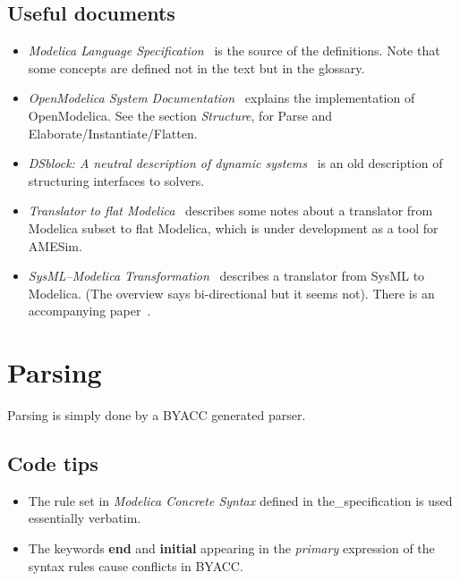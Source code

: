 \documentclass[10pt,b5paper]{article}
\begin{document}

\subsection{Useful documents}

\begin{itemize}

\item {\it{}Modelica Language Specification}~\cite{specification34} is
the source of the definitions.  Note that some concepts are defined
not in the text but in the glossary.

\item {\it{}OpenModelica System Documentation}~\cite{openmodelica2014}
explains the implementation of OpenModelica.  See the section
{\it{}Structure}, for Parse and Elaborate/Instantiate/Flatten.

\item {\it{}DSblock: A neutral description of dynamic
systems}~\cite{otter1994} is an old description of structuring
interfaces to solvers.

\item {\it{}Translator to flat Modelica}~\cite{lms2007} describes some
notes about a translator from Modelica subset to flat Modelica, which
is under development as a tool for AMESim.

\item {\it{}SysML--Modelica Transformation}~\cite{omg2012} describes a
translator from SysML to Modelica.  (The overview says bi-directional
but it seems not).  There is an accompanying paper~\cite{paredis2010}.

\end{itemize}


\section{Parsing}

{Parsing} is simply done by a BYACC generated parser.


\subsection{Code tips}

\begin{itemize}

\item The rule set in {\it{}Modelica Concrete Syntax\/} defined in
the_specification is used essentially verbatim.

\item The keywords {\bf{}end} and {\bf{}initial} appearing in the
{\it{}primary\/} expression of the syntax rules cause conflicts in
BYACC\@.

\end{itemize}
\end{document}
